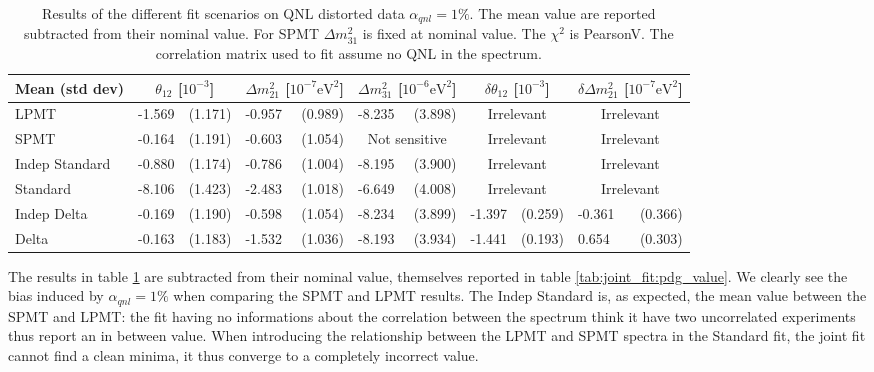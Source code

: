 \documentclass[../main.tex]{subfiles}
\begin{document}
\begin{table}[h]
  \begin{footnotesize}
  \centering
  \begin{tabular}{l|lr|lr|lr|lr|lr|}
    Mean (std dev)  & \multicolumn{2}{c|}{$\theta_{12}$ [$10^{-3}$]} & \multicolumn{2}{c|}{$\Delta m^2_{21}$ [$10^{-7}\mathrm{eV}^{2}$]} & \multicolumn{2}{c|}{$\Delta m^2_{31}$ [$10^{-6}\mathrm{eV}^{2}$]} & \multicolumn{2}{c|}{$\delta \theta_{12}$ [$10^{-3}$]} & \multicolumn{2}{c|}{$\delta \Delta m^2_{21}$ [$10^{-7}\mathrm{eV}^{2}$]} \\
    \hline
    LPMT            & -1.569 & (1.171) & -0.957 & (0.989) & -8.235 & (3.898)       & \multicolumn{2}{c|}{Irrelevant} & \multicolumn{2}{c|}{Irrelevant}  \\
    SPMT            & -0.164 & (1.191) & -0.603 & (1.054) & \multicolumn{2}{c|}{Not sensitive} &\multicolumn{2}{c|}{Irrelevant} & \multicolumn{2}{c|}{Irrelevant}  \\
    Indep Standard  & -0.880 & (1.174) & -0.786 & (1.004) & -8.195 & (3.900)       & \multicolumn{2}{c|}{Irrelevant} & \multicolumn{2}{c|}{Irrelevant}  \\
    Standard        & -8.106 & (1.423) & -2.483 & (1.018) & -6.649 & (4.008)       & \multicolumn{2}{c|}{Irrelevant} & \multicolumn{2}{c|}{Irrelevant}  \\
    Indep Delta     & -0.169 & (1.190) & -0.598 & (1.054) & -8.234 & (3.899)       & -1.397 & (0.259)     & -0.361 & (0.366) \\
    Delta           & -0.163 & (1.183) & -1.532 & (1.036) & -8.193 & (3.934)       & -1.441 & (0.193)     & 0.654  & (0.303) \\
  \end{tabular}
  \end{footnotesize}
  \caption{Results of the different fit scenarios on QNL distorted data $\alpha_{qnl} = 1\%$. The mean value are reported subtracted from their nominal value. For SPMT $\Delta m^2_{31}$ is fixed at nominal value. The $\chi^2$ is PearsonV. The correlation matrix used to fit assume no QNL in the spectrum.}
  \label{tab:joint_fit:qnl_results}
\end{table}

The results in table \ref{tab:joint_fit:qnl_results} are subtracted from their nominal value, themselves reported in table \ref{tab:joint_fit:pdg_value}. We clearly see the bias induced by $\alpha_{qnl} = 1\%$ when comparing the SPMT and LPMT results. The Indep Standard is, as expected, the mean value between the SPMT and LPMT: the fit having no informations about the correlation between the spectrum think it have two uncorrelated experiments thus report an in between value. When introducing the relationship between the LPMT and SPMT spectra in the Standard fit, the joint fit cannot find a clean minima, it thus converge to a completely incorrect value.
\end{document}
